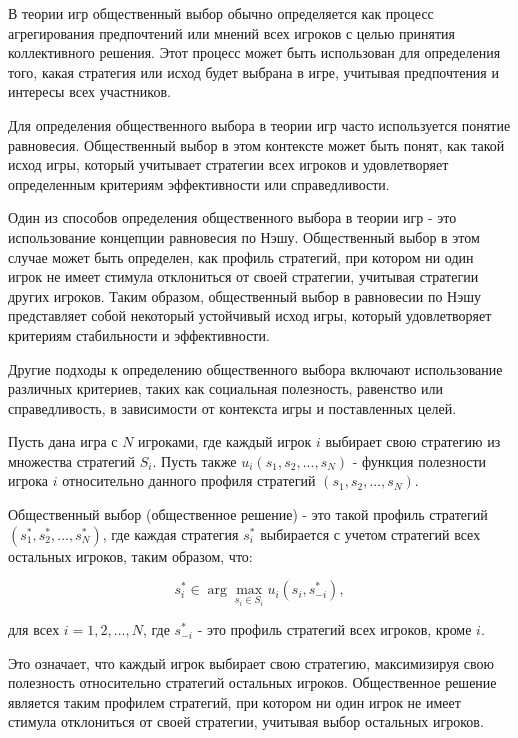 


В теории игр общественный выбор обычно определяется как процесс агрегирования предпочтений или мнений всех игроков с целью принятия коллективного решения. Этот процесс может быть использован для определения того, какая стратегия или исход будет выбрана в игре, учитывая предпочтения и интересы всех участников.

Для определения общественного выбора в теории игр часто используется понятие равновесия. Общественный выбор в этом контексте может быть понят, как такой исход игры, который учитывает стратегии всех игроков и удовлетворяет определенным критериям эффективности или справедливости.

Один из способов определения общественного выбора в теории игр - это использование концепции равновесия по Нэшу. Общественный выбор в этом случае может быть определен, как профиль стратегий, при котором ни один игрок не имеет стимула отклониться от своей стратегии, учитывая стратегии других игроков. Таким образом, общественный выбор в равновесии по Нэшу представляет собой некоторый устойчивый исход игры, который удовлетворяет критериям стабильности и эффективности.

Другие подходы к определению общественного выбора включают использование различных критериев, таких как социальная полезность, равенство или справедливость, в зависимости от контекста игры и поставленных целей.


Пусть дана игра с \(N\) игроками, где каждый игрок \(i\) выбирает свою стратегию из множества стратегий \(S_i\). Пусть также \(u_i(s_1, s_2, ..., s_N)\) - функция полезности игрока \(i\) относительно данного профиля стратегий \((s_1, s_2, ..., s_N)\).

Общественный выбор (общественное решение) - это такой профиль стратегий \((s_1^*, s_2^*, ..., s_N^*)\), где каждая стратегия \(s_i^*\) выбирается с учетом стратегий всех остальных игроков, таким образом, что:

\[ s_i^* \in \arg\max_{s_i \in S_i} u_i(s_i, s_{-i}^*), \]

для всех \(i = 1, 2, ..., N\), где \(s_{-i}^*\) - это профиль стратегий всех игроков, кроме \(i\).

Это означает, что каждый игрок выбирает свою стратегию, максимизируя свою полезность относительно стратегий остальных игроков. Общественное решение является таким профилем стратегий, при котором ни один игрок не имеет стимула отклониться от своей стратегии, учитывая выбор остальных игроков.
